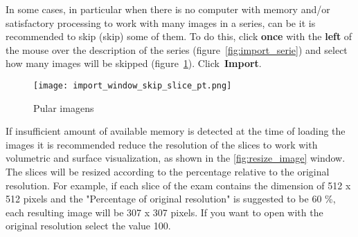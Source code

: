 

In some cases, in particular when there is no computer with memory and/or satisfactory processing to work with many images in a series, can be it is recommended to skip (skip) some of them. To do this, click \textbf {once} with the \textbf{left} of the mouse over the description of the series (figure~\ref{fig:import_serie}) and select how many images will be skipped (figure~\ref{fig:skip_image}). Click~\textbf {Import}.

\begin{figure}[!htb]
\centering
\texttt{[image: import\_window\_skip\_slice\_pt.png]}
\caption{Pular imagens}
\label{fig:skip_image}
\end{figure}



If insufficient amount of available memory is detected at the time of loading the images it is recommended reduce the resolution of the slices to work with volumetric and surface visualization, as shown in the \ref{fig:resize_image} window.
The slices will be resized according to the percentage relative to the original resolution. For example, if each slice of the exam contains the dimension of 512 x 512 pixels and the "Percentage of original resolution" is suggested to be 60 \%, each resulting image will be 307 x 307 pixels. If you want to open with the original resolution select the value 100.


